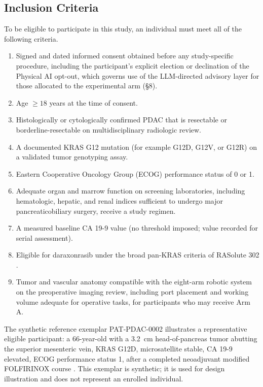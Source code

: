 \subsection{Inclusion Criteria}

To be eligible to participate in this study, an individual must meet all of the
following criteria.

\begin{enumerate}[leftmargin=1.6em,itemsep=2pt,topsep=2pt]
\item Signed and dated informed consent obtained before any study-specific
procedure, including the participant's explicit election or declination of the
Physical AI opt-out, which governs use of the LLM-directed advisory layer for those
allocated to the experimental arm (\S8).
\item Age $\geq 18$ years at the time of consent.
\item Histologically or cytologically confirmed PDAC that is resectable or
borderline-resectable on multidisciplinary radiologic review.
\item A documented KRAS G12 mutation (for example G12D, G12V, or G12R) on a
validated tumor genotyping assay.
\item Eastern Cooperative Oncology Group (ECOG) performance status of 0 or 1.
\item Adequate organ and marrow function on screening laboratories, including
hematologic, hepatic, and renal indices sufficient to undergo major
pancreaticobiliary surgery, receive a study regimen.
\item A measured baseline CA 19-9 value (no threshold imposed; value recorded for
serial assessment).
\item Eligible for daraxonrasib under the broad pan-KRAS criteria of RASolute 302
\cite{rasolute302}.
\item Tumor and vascular anatomy compatible with the eight-arm robotic system on
the preoperative imaging review, including port placement and working volume
adequate for operative tasks, for participants who may receive Arm A.
\end{enumerate}

The synthetic reference exemplar PAT-PDAC-0002 illustrates a representative
eligible participant: a 66-year-old with a 3.2~cm head-of-pancreas tumor abutting
the superior mesenteric vein, KRAS G12D, microsatellite stable, CA 19-9 elevated,
ECOG performance status 1, after a completed neoadjuvant modified FOLFIRINOX course
\cite{Conroy2018}. This exemplar is synthetic; it is used for design illustration
and does not represent an enrolled individual.

